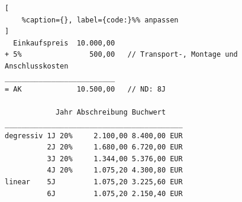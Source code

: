 \lstset{language=Python}%
\begin{lstlisting}[
	%caption={}, label={code:}%% anpassen
]
  Einkaufspreis  10.000,00
+ 5%                500,00   // Transport-, Montage und Anschlusskosten
__________________________
= AK             10.500,00   // ND: 8J

            Jahr Abschreibung Buchwert
__________________________________________           
degressiv 1J 20%     2.100,00 8.400,00 EUR
          2J 20%     1.680,00 6.720,00 EUR
          3J 20%     1.344,00 5.376,00 EUR      
          4J 20%     1.075,20 4.300,80 EUR
linear    5J         1.075,20 3.225,60 EUR
          6J         1.075,20 2.150,40 EUR
\end{lstlisting}
